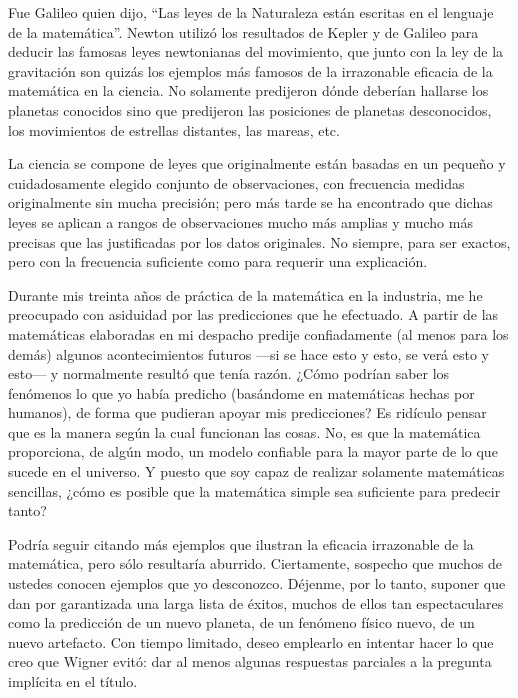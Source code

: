 \documentclass[a4paper, 12pt]{article}
\begin{document}
 

Fue Galileo quien dijo, ``Las leyes de la Naturaleza están escritas en el lenguaje de la matemática''. Newton utilizó los resultados de Kepler y de Galileo para deducir las famosas leyes newtonianas del movimiento, que junto con la ley de la gravitación son quizás los ejemplos más famosos de la irrazonable eficacia de la matemática en la ciencia. No solamente predijeron dónde deberían hallarse los planetas conocidos sino que predijeron las posiciones de planetas desconocidos, los movimientos de estrellas distantes, las mareas, etc.

 

La ciencia se compone de leyes que originalmente están basadas en un pequeño y cuidadosamente elegido conjunto de observaciones, con frecuencia medidas originalmente sin mucha precisión; pero más tarde se ha encontrado que dichas leyes se aplican a rangos de observaciones mucho más amplias y mucho más precisas que las justificadas por los datos originales. No siempre, para ser exactos, pero con la frecuencia suficiente como para requerir una explicación.



Durante mis treinta años de práctica de la matemática en la industria, me he preocupado con asiduidad por las predicciones que he efectuado. A partir de las matemáticas elaboradas en mi despacho predije confiadamente (al menos para los demás) algunos acontecimientos futuros ---si se hace esto y esto, se verá esto y esto--- y normalmente resultó que tenía razón. ¿Cómo podrían saber los fenómenos lo que yo había predicho (basándome en matemáticas hechas por humanos), de forma que pudieran apoyar mis predicciones? Es ridículo pensar que es la manera según la cual funcionan las cosas. No, es que la matemática proporciona, de algún modo, un modelo confiable para la mayor parte de lo que sucede en el universo. Y puesto que soy capaz de realizar solamente matemáticas sencillas, ¿cómo es posible que la matemática simple sea suficiente para predecir tanto?



Podría seguir citando más ejemplos que ilustran la eficacia irrazonable de la matemática, pero sólo resultaría aburrido. Ciertamente, sospecho que muchos de ustedes conocen ejemplos que yo desconozco. Déjenme, por lo tanto, suponer que dan por garantizada una larga lista de éxitos, muchos de ellos tan espectaculares como la predicción de un nuevo planeta, de un fenómeno físico nuevo, de un nuevo artefacto. Con tiempo limitado, deseo emplearlo en intentar hacer lo que creo que Wigner evitó: dar al menos algunas respuestas parciales a la pregunta implícita en el título.  
\end{document}
